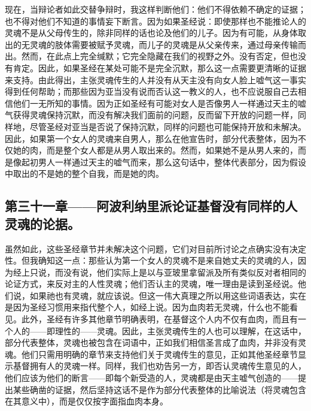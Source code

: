 现在，当辩论者如此交替争辩时，我这样判断他们：他们不得依赖不确定的证据；也不得对他们不知道的事情妄下断言。因为如果圣经说：即使那样也不能推论人的灵魂不是从父母传生的，除非同样的话也论及他们的儿子。因为有可能，从身体取出的无灵魂的肢体需要被赋予灵魂，而儿子的灵魂是从父亲传来，通过母亲传输而出。然而，在此点上完全缄默；它完全隐藏在我们的视野之外。没有否定，但也没有肯定。因此，如果圣经在某处可能不是完全沉默，那么这一点需要更清晰的证据来支持。由此得出，主张灵魂传生的人并没有从天主没有向女人脸上嘘气这一事实得到任何帮助；而那些因为亚当没有说而否认这一教义的人，也不应说服自己去相信他们一无所知的事情。因为正如圣经有可能对女人是否像男人一样通过天主的嘘气获得灵魂保持沉默，而没有解决我们面前的问题，反而留下开放的问题一样，同样地，尽管圣经对亚当是否说了保持沉默，同样的问题也可能保持开放和未解决。因此，如果第一个女人的灵魂来自男人，那么在他宣告时，部分代表整体，因为不仅她的肉，而是整个女人都是从男人取出来的。然而，如果她不是从男人来的，而是像起初男人一样通过天主的嘘气而来，那么这句话中，整体代表部分，因为假设中取出的不是她的整个自我，而是她的肉。\par


\subsection{第三十一章——阿波利纳里派论证基督没有同样的人灵魂的论据。}

虽然如此，这些圣经章节并未解决这个问题，它们对目前所讨论之点确实没有决定性。但我确知这一点：那些认为第一个女人的灵魂不是来自她丈夫的灵魂的人，因为经上只说，而没有说，他们实际上是以与亚玻里拿留派及所有类似反对者相同的论证方式，来反对主的人性灵魂；他们否认主的灵魂，唯一理由是读到圣经说。他们说，如果祂也有灵魂，就应该说。但这一伟大真理之所以用这些词语表达，实在是因为圣经习惯用来指代整个人，如经上说。因为血肉若无灵魂，什么也不能看见。此外，圣经有许多其他章节明确表明，在基督这个人内不仅有血肉，而且有一个人的——即理性的——灵魂。因此，主张灵魂传生的人也可以理解，在这话中，部分代表整体，灵魂也被包含在词语中，正如我们相信圣言成了血肉，并非没有灵魂。他们只需用明确的章节来支持他们关于灵魂传生的意见，正如其他圣经章节显示基督拥有人的灵魂一样。同样，我们也劝告另一方，即否认灵魂传生意见的人，他们应该为他们的断言——即每个新受造的人，灵魂都是由天主嘘气创造的——提出某些确凿的证据，然后坚持这话不是作为部分代表整体的比喻说法（将灵魂包含在其意义中），而是仅仅按字面指血肉本身。\par

